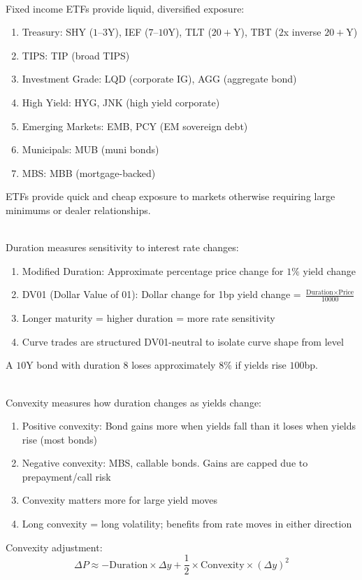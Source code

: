 \documentclass[a4paper,oneside,openany]{book}
\begin{document}
\begin{remark} \\
Fixed income ETFs provide liquid, diversified exposure:
\begin{enumerate}[label=\roman*.]
\setlength{\itemsep}{0pt}
\item Treasury: SHY ($1$--$3$Y), IEF ($7$--$10$Y), TLT ($20+$Y), TBT ($2$x inverse $20+$Y)
\item TIPS: TIP (broad TIPS)
\item Investment Grade: LQD (corporate IG), AGG (aggregate bond)
\item High Yield: HYG, JNK (high yield corporate)
\item Emerging Markets: EMB, PCY (EM sovereign debt)
\item Municipals: MUB (muni bonds)
\item MBS: MBB (mortgage-backed)
\end{enumerate}
ETFs provide quick and cheap exposure to markets otherwise requiring large minimums or dealer relationships.
\end{remark}

\begin{remark} \\
Duration measures sensitivity to interest rate changes:
\begin{enumerate}[label=\roman*.]
\setlength{\itemsep}{0pt}
\item Modified Duration: Approximate percentage price change for $1\%$ yield change
\item DV01 (Dollar Value of 01): Dollar change for 1bp yield change = $\frac{\text{Duration} \times \text{Price}}{10000}$
\item Longer maturity = higher duration = more rate sensitivity
\item Curve trades are structured DV01-neutral to isolate curve shape from level
\end{enumerate}
A $10$Y bond with duration $8$ loses approximately $8\%$ if yields rise $100$bp.
\end{remark}

\begin{remark} \\
Convexity measures how duration changes as yields change:
\begin{enumerate}[label=\roman*.]
\setlength{\itemsep}{0pt}
\item Positive convexity: Bond gains more when yields fall than it loses when yields rise (most bonds)
\item Negative convexity: MBS, callable bonds. Gains are capped due to prepayment/call risk
\item Convexity matters more for large yield moves
\item Long convexity = long volatility; benefits from rate moves in either direction
\end{enumerate}
Convexity adjustment:
\begin{equation*}
\Delta P \approx -\text{Duration} \times \Delta y + \frac{1}{2} \times \text{Convexity} \times (\Delta y)^2
\end{equation*}
\end{remark}
\end{document}
